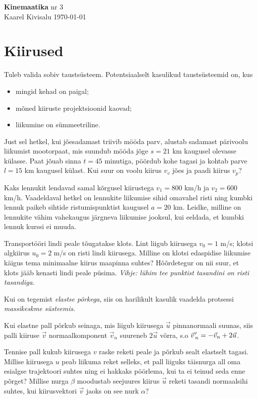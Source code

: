 \documentclass[a4paper,11pt,twocolumn]{article}
\begin{document}
{\huge \textbf{Kinemaatika} \hfill \normalsize {nr 3}} \\
{Kaarel Kivisalu \hfill \today}

\section{Kiirused}
Tuleb valida sobiv taustsüsteem. Potentsiaalselt kasulikud taustsüsteemid on, kus
{\setlength{\parskip}{0em}
\begin{itemize}[noitemsep,nolistsep]
	\item mingid kehad on paigal;
	\item mõned kiiruste projektsioonid kaovad;
	\item liikumine on sümmeetriline.
\end{itemize}}
\begin{question}[Piirk 2015, P2]
	Just sel hetkel, kui jõesadamast triivib mööda parv, alustab sadamast pärivoolu liikumist mootorpaat, mis suundub mööda jõge $ s = 21 $ km kaugusel olevasse külasse. Paat jõuab sinna $ t = 45 $ minutiga, pöördub kohe tagasi ja kohtab parve $ l=15 $ km kaugusel külast. Kui suur on voolu kiirus $ v_v $ jões ja paadi kiirus $ v_p $?
\end{question}
\begin{question}[Piirk 2014, P9][kin1][4.4cm]
	Kaks lennukit lendavad samal kõrgusel kiirustega $ v_1 = 800 $ km/h ja $ v_2 = 600 $ km/h. Vaadeldaval hetkel on lennukite liikumise sihid omavahel risti ning kumbki lennuk paikeb sihtide ristumispunktist kaugusel $ a = 20 $ km. Leidke, milline on lennukite vähim vahekaugus järgneva liikumise jooksul, kui eeldada, et kumbki lennuk kurssi ei muuda.
\end{question}
\begin{question}
	Transportööri lindi peale tõugatakse klots. Lint liigub kiirusega $ v_0= 1 $ m/s; klotsi algkiirus $ u_0= 2 $ m/s on risti lindi kiirusega. Milline on klotsi edaspidise liikumise käigus tema minimaalne kiirus maapinna suhtes? Hõõrdetegur on nii suur, et klots jääb kenasti lindi peale püsima. \textit{Vihje: lühim tee punktist tasandini on risti tasandiga.}
\end{question}
Kui on tegemist \textit{elastse põrkega}, siis on harilikult kasulik vaadelda protsessi \textit{massikeskme süsteemis}.

Kui elastne pall põrkub seinaga, mis liigub kiirusega $ \vec{u} $ pinnanormaali suunas, siis palli kiiruse $ \vec{v} $ normaalkomponent $ \vec{v}_n $ suureneb $ 2\vec{u} $ võrra, s.o $\pvec{v}'_n=-\vec{v}_n+2\vec{u} $.
\begin{question}[NSVL ol. 1983, 9. kl]
	Tennise pall kukub kiirusega $ v $ raske reketi peale ja põrkub sealt elastselt tagasi. Millise kiirusega $ u $ peab liikuma reket selleks, et pall liiguks täisnurga all oma esialgse trajektoori suhtes ning ei hakkaks pöörlema, kui ta ei teinud seda enne põrget? Millise nurga $ \beta $ moodustab seejuures kiirus $ \vec{u} $ reketi tasandi normaalsihi suhtes, kui kiirusvektori $ \vec{v} $ jaoks on see nurk $ \alpha $?
\end{question}
\end{document}
